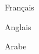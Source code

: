 \begin{cventries}
  \cventry
    {}
    {}
    {}
    {}
    {
      \begin{cvitems}
        \item {Français}
        \item {Anglais}
        \item {Arabe}
      \end{cvitems}
    }
\end{cventries}
